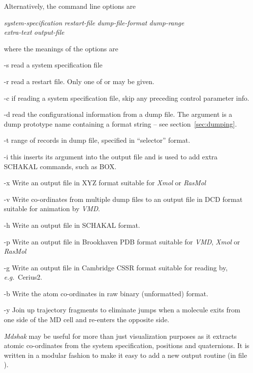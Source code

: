 \documentclass[a4paper,twoside]{report}
\newcommand{\eg}{\emph{e.g.}}
\begin{document}
Alternatively, the command line options are
\begin{center}
\Lit{[-s} \textit{system-specification} \Lit{]|}%
\Lit{[-r} \textit{restart-file} \Lit{]}
\Lit{[-d} \textit{dump-file-format} \Lit{]}
\Lit{[-t} \textit{dump-range} \Lit{]} \\
\Lit{[-c]}
\Lit{[-x|-v|-h|-p|-g|-b]}
\Lit{[-y]}
\Lit{[-i} \textit{extra-text} \Lit{]}
\Lit{[-o} \textit{output-file} \Lit{]}
\end{center}
where the meanings of the options are
\begin{Argdescription}
\item[-s] read a system specification file
\item[-r] read a restart file.  Only one of  or  may
be given.
\item[-c] if reading a system specification file, skip any preceding
control parameter info.
\item[-d] read the configurational information from a dump file.  The
argument is a dump prototype name containing a  format
string -- see section~\ref{sec:dumping}.
\item[-t] range of records in dump file, specified in ``selector''
format.
\item[-i]   this inserts its argument into the output file and is used
to add extra SCHAKAL commands, such as BOX.
\item[-x] Write an output file in XYZ format suitable for \emph{Xmol}
  or \emph{RasMol}
\item[-v] Write co-ordinates from multiple dump files to an output
  file in DCD format suitable for animation by \emph{VMD}.
\item[-h] Write an output file in SCHAKAL format.
\item[-p] Write an output file in Brookhaven PDB format suitable for
  \emph{VMD}, \emph{Xmol}  or \emph{RasMol}
\item[-g] Write an output file in Cambridge CSSR format suitable for
  reading by, \eg\ Cerius2.
\item[-b] Write the atom co-ordinates in raw binary (unformatted)
  format.
\item[-y] Join up trajectory fragments to eliminate jumps when a
  molecule exits from one side of the MD cell and re-enters the
  opposite side.
\end{Argdescription}

\emph{Mdshak} may be useful for more than just visualization purposes
as it extracts atomic co-ordinates from the system specification,
positions and quaternions.  It is written in a modular fashion
to make it easy to add a new output routine (in file ).
\end{document}
